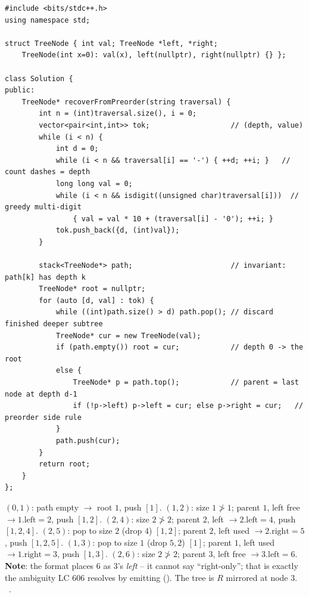 \begin{lstlisting}[caption={Recover a Tree From Preorder Traversal (LeetCode 1028)}, label={lst:c04-recover-preorder}]
#include <bits/stdc++.h>
using namespace std;

struct TreeNode { int val; TreeNode *left, *right;
    TreeNode(int x=0): val(x), left(nullptr), right(nullptr) {} };

class Solution {
public:
    TreeNode* recoverFromPreorder(string traversal) {
        int n = (int)traversal.size(), i = 0;
        vector<pair<int,int>> tok;                   // (depth, value)
        while (i < n) {
            int d = 0;
            while (i < n && traversal[i] == '-') { ++d; ++i; }   // count dashes = depth
            long long val = 0;
            while (i < n && isdigit((unsigned char)traversal[i]))  // greedy multi-digit
                { val = val * 10 + (traversal[i] - '0'); ++i; }
            tok.push_back({d, (int)val});
        }

        stack<TreeNode*> path;                       // invariant: path[k] has depth k
        TreeNode* root = nullptr;
        for (auto [d, val] : tok) {
            while ((int)path.size() > d) path.pop(); // discard finished deeper subtree
            TreeNode* cur = new TreeNode(val);
            if (path.empty()) root = cur;            // depth 0 -> the root
            else {
                TreeNode* p = path.top();            // parent = last node at depth d-1
                if (!p->left) p->left = cur; else p->right = cur;   // preorder side rule
            }
            path.push(cur);
        }
        return root;
    }
};
\end{lstlisting}

\begin{tracebox}
$(0,1)$: path empty $\to$ root $1$, push $[1]$.
$(1,2)$: size $1 \ngtr 1$; parent $1$, left free $\to 1.\text{left}=2$, push $[1,2]$.
$(2,4)$: size $2 \ngtr 2$; parent $2$, left $\to 2.\text{left}=4$, push $[1,2,4]$.
$(2,5)$: pop to size $2$ (drop $4$) $[1,2]$; parent $2$, left used $\to 2.\text{right}=5$, push $[1,2,5]$.
$(1,3)$: pop to size $1$ (drop $5,2$) $[1]$; parent $1$, left used $\to 1.\text{right}=3$, push $[1,3]$.
$(2,6)$: size $2 \ngtr 2$; parent $3$, left free $\to 3.\text{left}=6$. \textbf{Note}: the format
places $6$ as $3$'s \emph{left} -- it cannot say ``right-only''; that is exactly
the ambiguity LC 606 resolves by emitting \code{()} (). The tree is $R$
mirrored at node $3$. \checkmark\ .
\end{tracebox}

